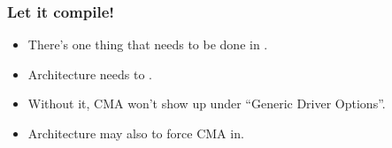 \begin{frame}
  \frametitle{Let it compile!}

  \begin{itemize}
  \item There's one thing that needs to be done in .
  \item Architecture needs to .
  \item Without it, CMA won't show up under “Generic Driver Options”.
  \item Architecture may also  to force CMA in.
  \end{itemize}
\end{frame}

